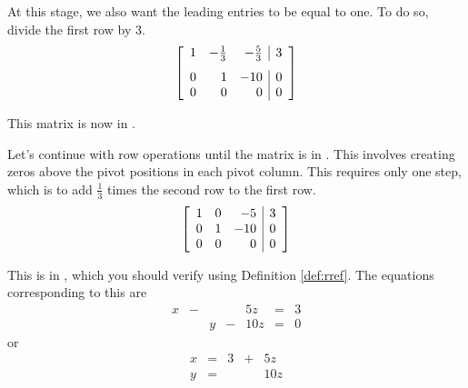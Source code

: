 \begin{solution}
At this stage, we also want the leading entries to be equal to one. To do so, divide the first row by $3$.
\begin{equation*}
\leftB
\begin{array}{rrr|r}
1 & -\vspace{0.05in}\frac{1}{3} &  -\vspace{0.05in}\frac{5}{3} & 3 \\
0 &  1 & -10 & 0 \\
0 &  0 &   0 & 0
\end{array}
\rightB
\end{equation*}

This matrix is now in \ef. 

Let's continue with row operations until the matrix is in \rref. 
This involves creating zeros above the pivot positions in each pivot column. 
This requires only one step, which is to add $ \frac{1}{3}$ times the second row to the first row.
\begin{equation*}
\left[
\begin{array}{rrr|r}
1 & 0 & -5 & 3 \\
0 & 1 & -10 & 0 \\
0 & 0 & 0 & 0
\end{array}
\right] 
\end{equation*}


This is in \rref, which you should verify using Definition \ref{def:rref}.
 The equations corresponding to this \rref \;are
\[
\begin{array}{cccccccc}
x &-& &&5z&=&3 \\
&&y &-& 10z &=& 0 
\end{array}
\]
or
\[
\begin{array}{ccccccc}
x&=&3&+&5z \\
y &=& &&10z
\end{array}
\]


\end{solution}
